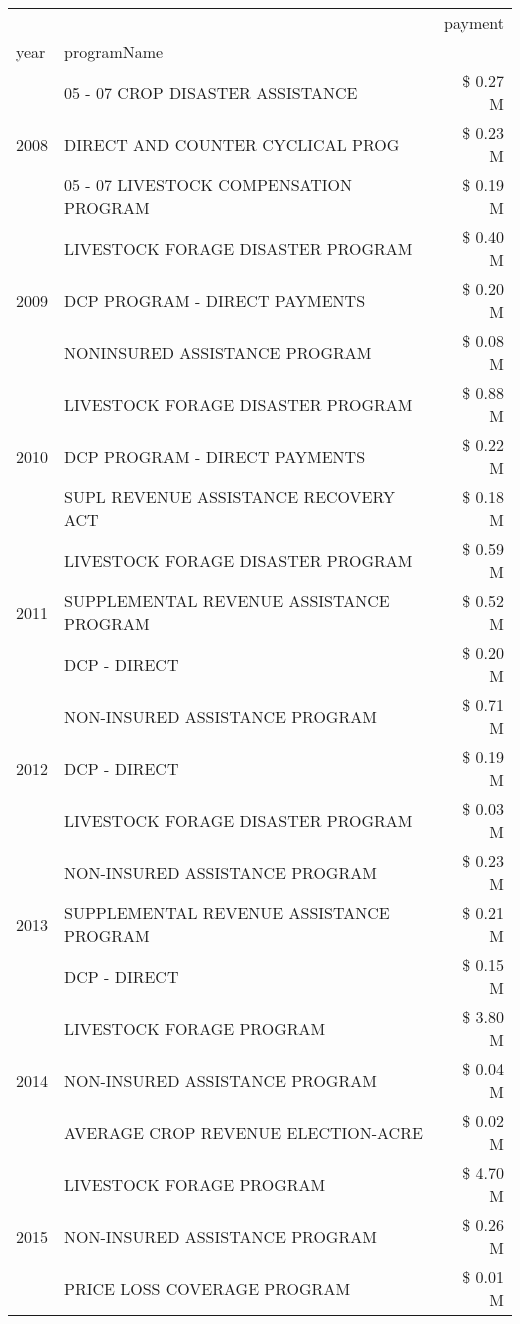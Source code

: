 \begin{tabular}{llr}
\toprule
 &  & payment \\
year & programName &  \\
\midrule
\multirow[t]{3}{*}{2008} & 05 - 07 CROP DISASTER ASSISTANCE & \$ 0.27 M \\
 & DIRECT AND COUNTER CYCLICAL PROG & \$ 0.23 M \\
 & 05 - 07 LIVESTOCK COMPENSATION PROGRAM & \$ 0.19 M \\
\cline{1-3}
\multirow[t]{3}{*}{2009} & LIVESTOCK FORAGE DISASTER  PROGRAM & \$ 0.40 M \\
 & DCP PROGRAM - DIRECT PAYMENTS & \$ 0.20 M \\
 & NONINSURED ASSISTANCE PROGRAM & \$ 0.08 M \\
\cline{1-3}
\multirow[t]{3}{*}{2010} & LIVESTOCK FORAGE DISASTER  PROGRAM & \$ 0.88 M \\
 & DCP PROGRAM - DIRECT PAYMENTS & \$ 0.22 M \\
 & SUPL REVENUE ASSISTANCE RECOVERY ACT & \$ 0.18 M \\
\cline{1-3}
\multirow[t]{3}{*}{2011} & LIVESTOCK FORAGE DISASTER PROGRAM & \$ 0.59 M \\
 & SUPPLEMENTAL REVENUE ASSISTANCE PROGRAM & \$ 0.52 M \\
 & DCP - DIRECT & \$ 0.20 M \\
\cline{1-3}
\multirow[t]{3}{*}{2012} & NON-INSURED ASSISTANCE PROGRAM & \$ 0.71 M \\
 & DCP - DIRECT & \$ 0.19 M \\
 & LIVESTOCK FORAGE DISASTER PROGRAM & \$ 0.03 M \\
\cline{1-3}
\multirow[t]{3}{*}{2013} & NON-INSURED ASSISTANCE PROGRAM & \$ 0.23 M \\
 & SUPPLEMENTAL REVENUE ASSISTANCE PROGRAM & \$ 0.21 M \\
 & DCP - DIRECT & \$ 0.15 M \\
\cline{1-3}
\multirow[t]{3}{*}{2014} & LIVESTOCK FORAGE PROGRAM & \$ 3.80 M \\
 & NON-INSURED ASSISTANCE PROGRAM & \$ 0.04 M \\
 & AVERAGE CROP REVENUE ELECTION-ACRE & \$ 0.02 M \\
\cline{1-3}
\multirow[t]{3}{*}{2015} & LIVESTOCK FORAGE PROGRAM & \$ 4.70 M \\
 & NON-INSURED ASSISTANCE PROGRAM & \$ 0.26 M \\
 & PRICE LOSS COVERAGE PROGRAM & \$ 0.01 M \\
\cline{1-3}

\end{tabular}
